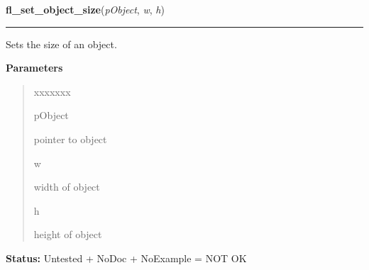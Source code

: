 \hspace{.8\funcindent}\begin{boxedminipage}{\funcwidth}

    \raggedright \textbf{fl\_set\_object\_size}(\textit{pObject}, \textit{w}, \textit{h})

    \vspace{-1.5ex}

    \rule{\textwidth}{0.5\fboxrule}
\setlength{\parskip}{2ex}
    Sets the size of an object.

\setlength{\parskip}{1ex}
      \textbf{Parameters}
      \vspace{-1ex}

      \begin{quote}
        \begin{Ventry}{xxxxxxx}

          \item[pObject]

          pointer to object

          \item[w]

          width of object

          \item[h]

          height of object

        \end{Ventry}

      \end{quote}

\textbf{Status:} Untested + NoDoc + NoExample = NOT OK



    \end{boxedminipage}

    \label{xformslib:library:fl_set_object_automatic}

    \vspace{0.5ex}

